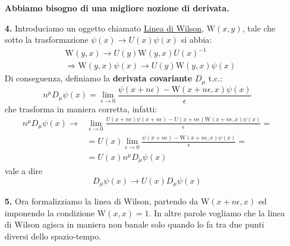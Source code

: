 \documentclass[../main.tex]{subfiles}
\begin{document}
\begin{enumerate}
    \textbf{Abbiamo bisogno di una migliore nozione di derivata.}
    
    \item[\textbf{4.}] Introduciamo un oggetto chiamato \href{https://en.wikipedia.org/wiki/Wilson_loop}{Linea di Wilson}, $\textrm{W}(x,y)$, tale che sotto la trasformazione $\psi(x) \rightarrow U(x)\psi(x)$ si abbia:
    \begin{equation}
        \begin{aligned}
            &\textrm{W}(y,x) \rightarrow U(y)\textrm{W}(y,x)U(x)^{-1} \\
            &\Rightarrow\textrm{W}(y,x)\psi(x) \rightarrow U(y)\textrm{W}(y,x)\psi(x)
        \end{aligned}
        \label{eq:wilson_line_transform_prop}
    \end{equation}
    Di conseguenza, definiamo la \textbf{derivata covariante} $D_\mu$ t.c.:
    \begin{equation}
        \boxed{n^\mu D_\mu\psi(x) = \lim_{\epsilon\rightarrow0} \frac{\psi(x+n\epsilon) - \textrm{W}(x+n\epsilon,x)\psi(x)}{\epsilon}}
        \label{eq:covder_action}
    \end{equation}
    che trasforma in maniera corretta, infatti:
    \begin{align*}
        n^\mu D_\mu\psi(x) \rightarrow &\lim_{\epsilon\rightarrow0} \frac{U(x+n\epsilon)\psi(x+n\epsilon) - U(x+n\epsilon)\textrm{W}(x+n\epsilon,x)\psi(x)}{\epsilon} =\\
        &=U(x)\lim_{\epsilon\rightarrow0} \frac{\psi(x+n\epsilon) - \textrm{W}(x+n\epsilon,x)\psi(x)}{\epsilon} =\\
        &=U(x)n^\mu D_\mu\psi(x)
    \end{align*}
    vale a dire
    \begin{equation}
        \boxed{D_\mu\psi(x) \rightarrow U(x)D_\mu\psi(x)}
        \label{eq:covder_transf}
    \end{equation}
    
    \item[\textbf{5.}] Ora formalizziamo la linea di Wilson, partendo da $\textrm{W}(x+n\epsilon,x)$ ed imponendo la condizione $\textrm{W}(x,x)=1$. In altre parole vogliamo che la linea di Wilson agisca in maniera non banale solo quando lo fa tra due punti diversi dello spazio-tempo.


\end{enumerate}
\end{document}
